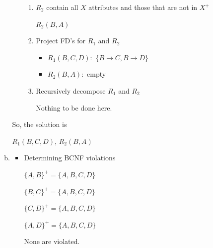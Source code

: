 \documentclass[12pt]{article}
\begin{document}
\begin{enumerate}[1.]
\begin{enumerate}[a)]
\begin{itemize}
\begin{enumerate}[1.]
                \item $R_2$ contain all $X$ attributes and those that are not in $X^+$

                \color{red}
                $R_2(B,A)$
                \color{black}

                \item Project FD's for $R_1$ and $R_2$

                \bigskip

                \begin{itemize}
                    \item $R_1(B,C,D):$ \color{red}$\{B \to C, B \to D\}$\color{black}
                    \item $R_2(B,A):$ \color{red}empty\color{black}

                \end{itemize}
                \item Recursively decompose $R_1$ and $R_2$

                \bigskip

                Nothing to be done here.


            \end{enumerate}

        \end{itemize}

        \bigskip

        So, the solution is

        \bigskip

        $R_1(B,C,D)$, $R_2(B,A)$

        \item


        \begin{itemize}
            \item Determining BCNF violations

            \bigskip

            $\{A,B\}^+ = \{A,B,C,D\}$

            \bigskip

            $\{B,C\}^+ = \{A,B,C,D\}$

            \bigskip

            $\{C,D\}^+ = \{A,B,C,D\}$

            \bigskip

            $\{A,D\}^+ = \{A,B,C,D\}$

            \bigskip

            None are violated.
        \end{itemize}


\end{enumerate}
\end{enumerate}
\end{document}
